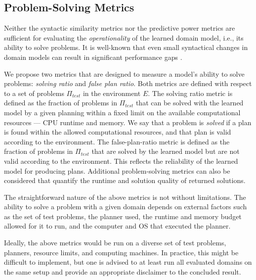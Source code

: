 \documentclass{article}
\theoremstyle{definition}
\theoremstyle{remark}
\newcommand{\ptest}{\ensuremath{\Pi_{\textit{test}}}\xspace}
\newif\ifaddcomments
\newcommand{\roni}[1]{\ifaddcomments{\textcolor{red}{[Roni: #1]}}\fi}
\newcommand{\mauro}[1]{\ifaddcomments{\textcolor{green}{[Mauro: #1]}}\fi}
\newcommand{\gregor}[1]{\ifaddcomments{\textcolor{orange}{[Gregor: #1]}}\fi}
\begin{document}
\subsection{Problem-Solving Metrics}
Neither the syntactic similarity metrics nor the predictive power metrics are sufficient for evaluating the \emph{operationality} \citep{DBLP:conf/kcap/McCluskeyVV17} of the learned domain model, i.e., its ability to solve problems. It is well-known that even small syntactical changes in domain models can result in significant performance gaps \citep{DBLP:conf/kcap/VallatiC19,vallati2021importance}.

We propose two metrics that are designed to measure a model's ability to solve problems: \emph{solving ratio} and \emph{false plan ratio}. 
Both metrics are defined with respect to a set of problems \ptest in the environment $E$. 
The solving ratio metric is defined as the fraction of problems in \ptest that can be solved with the learned model by a given planning within a fixed limit on the available computational resources --- CPU runtime and memory.
We say that a problem is \emph{solved} if a plan is found within the allowed computational resources, and that plan is valid according to the environment. 
The false-plan-ratio metric is defined as the fraction of problems in \ptest that are solved by the learned model but are not valid according to the environment. This reflects the reliability of the learned model for producing plans. 
Additional problem-solving metrics can also be considered that quantify the runtime and solution quality of returned solutions. 

The straightforward nature of the above metrics is not without limitations. The ability to solve a problem with a given domain depends on external factors such as the set of test problems, the planner used, the runtime and memory budget allowed for it to run, and the computer and OS that executed the planner.
\gregor{Theorem provers and proof assistants, e.g., Lean, sometimes use ``heartbearts'' (\url{https://florisvandoorn.com/carleson/docs/Lean/Util/Heartbeats.html}) instead of time. They measure elementary orations and bound their number. This ensures reproducibility across different machines. For us this could e.g.\ be number of expanded states. Or the number of times an effect is applied -- this would also include computation effort for heuristics.}
\roni{I am not sure I fully understand. I know that in search people often count nodes expanded instead (or in addition to) time because expanded nodes is less affected by what the OS is doing. But doing something similar here is not trivial, I think?}
Ideally, the above metrics would be run on a diverse set of test problems, planners, resource limits, and computing machines. In practice, this might be difficult to implement, but one is advised to at least run all evaluated domains on the same setup and provide an appropriate disclaimer to the concluded result. 
\end{document}

